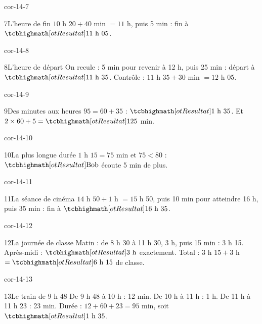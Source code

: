 \begin{blocLivre}{cor-14-7}\begin{corrige}{7}{L’heure de fin}
$10$ h $20+40$ min $=11$ h, puis 5 min : fin à $\res{11\ \text h\ 05}$.
\end{corrige}\end{blocLivre}
\begin{blocLivre}{cor-14-8}\begin{corrige}{8}{L’heure de départ}
On recule : 5 min pour revenir à 12 h, puis 25 min : départ à $\res{11\ \text h\ 35}$. Contrôle : $11$ h $35+30$ min $=12$ h 05.
\end{corrige}\end{blocLivre}
\begin{blocLivre}{cor-14-9}\begin{corrige}{9}{Des minutes aux heures}
$95=60+35$ : $\res{1\ \text h\ 35}$. Et $2\times60+5=\res{125}$ min.
\end{corrige}\end{blocLivre}
\begin{blocLivre}{cor-14-10}\begin{corrige}{10}{La plus longue durée}
$1$ h $15=75$ min et $75<80$ : $\res{\text{Bob}}$ écoute 5 min de plus.
\end{corrige}\end{blocLivre}
\begin{blocLivre}{cor-14-11}\begin{corrige}{11}{La séance de cinéma}
$14$ h $50+1$ h $=15$ h 50, puis 10 min pour atteindre 16 h, puis 35 min : fin à $\res{16\ \text h\ 35}$.
\end{corrige}\end{blocLivre}
\begin{blocLivre}{cor-14-12}\begin{corrige}{12}{La journée de classe}
Matin : de 8 h 30 à 11 h 30, 3 h, puis 15 min : 3 h 15. Après-midi : $\res{3\ \text h}$ exactement. Total : $3$ h $15+3$ h $=\res{6\ \text h\ 15}$ de classe.
\label{fig-cor-14-12}
\end{corrige}\end{blocLivre}
\begin{blocLivre}{cor-14-13}\begin{corrige}{13}{Le train de 9 h 48}
De 9 h 48 à 10 h : 12 min. De 10 h à 11 h : 1 h. De 11 h à 11 h 23 : 23 min. Durée : $12+60+23=95$ min, soit $\res{1\ \text h\ 35}$.
\end{corrige}\end{blocLivre}

